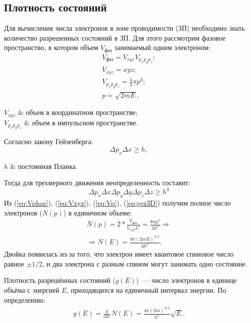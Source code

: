 \subsection{Плотность состояний}
Для вычисления числа электронов в зоне проводимости (ЗП) необходимо знать количество разрешенных состояний в ЗП. Для этого рассмотрим фазовое пространство, в котором объем $V_{\text{фаз}}$ занимаемый одним электроном:
\begin{gather}
	\label{eq:Vphaz}
 	V_{\text{фаз}} = V_{xyz}V_{p_{x}p_{y}p_{z}};\\
	\label{eq:Vxyz}
 	V_{xyz} = xyz;\\
 	\label{eq:Vp}
 	V_{p_{x}p_{y}p_{z}} = \frac{4}{3}\pi p^{3};\\
 	\label{eq:p}
 	p = \sqrt{2mE},
\end{gather} 
\begin{conditions}
	$V_{xyz}$ & объем в координатном пространстве;\\
	$V_{p_{x}p_{y}p_{z}}$ & объем в импульсном пространстве. 
\end{conditions}
Согласно закону Гейзенберга:
\begin{equation}
	\label{eq:gez}
	\Delta p_{x} \Delta x \geq h,
\end{equation}
\begin{conditions}
	$h$ & постоянная Планка.
\end{conditions}
Тогда для трехмерного движения неопределенность составит:
\begin{equation}
	\label{eq:gez3D}
	\Delta p_{x} \Delta x \Delta p_{y} \Delta y\Delta p_{z} \Delta z\geq h^{3}
\end{equation}
Из (\ref{eq:Vphaz}), (\ref{eq:Vxyz}), (\ref{eq:Vp}), (\ref{eq:gez3D}) получим полное число электронов ($N(p)$) в единичном объеме:
\begin{gather}
	N(p) = 2* \frac{V_{\text{фаз}}}{V_{xyz}h^{3}} = \frac{8\pi p^{3}}{3h^{3}} \Rightarrow \\
	\Rightarrow N(E) =  \frac{8\pi (2mE)^{3/2}}{3h^{3}}.
\end{gather}
Двойка появилась из-за того, что электрон имеет квантовое спиновое число равное $\pm 1/2$, и два электрона с разным спином могут занимать одно состояние.

Плотность разрешённых состояний ($g(E)$)~--- число электронов в единице объёма с энергией $E$, приходящихся на единичный интервал энергии. По определению:
\begin{gather}
	g(E) = \frac{d}{dE}\,N(E) = \frac{4\pi (2m)^{3/2}}{h^{2}}\sqrt{E}.
\end{gather}


